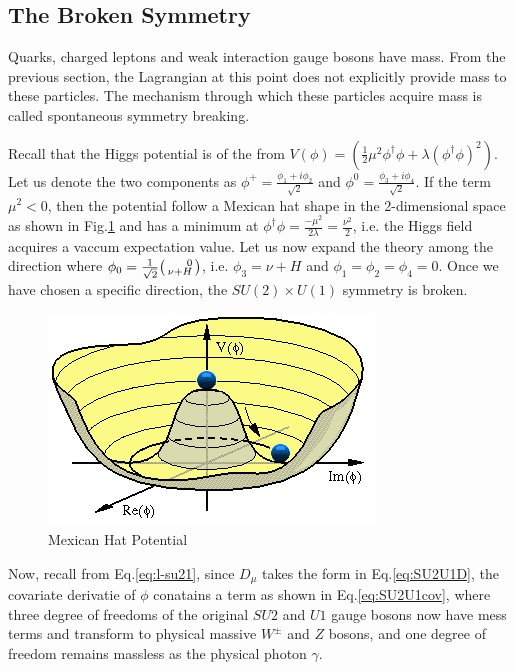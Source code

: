 \label{sec:theory-higgs}
\subsection{The Broken Symmetry}

Quarks, charged leptons and weak interaction gauge bosons have mass. From the previous section, the Lagrangian at this point does not explicitly provide mass to these particles. The mechanism through which these particles acquire mass is called spontaneous symmetry breaking.

Recall that the Higgs potential is of the from $V(\phi)=(\frac{1}{2}\mu^2\phi^{\dagger}\phi+\lambda(\phi^{\dagger}\phi )^2)$. Let us denote the two components as $\phi^+ = \frac{\phi_1+i\phi_2}{\sqrt{2}}$ and $\phi^0 = \frac{\phi_3+i\phi_4}{\sqrt{2}}$. If the term $\mu^2<0$, then the potential follow a Mexican hat shape in the 2-dimensional space as shown in Fig.\ref{fig:theory-mexican} and has a minimum at $\phi^{\dagger}\phi = \frac{-\mu^2}{2\lambda} = \frac{\nu^2}{2}$, i.e. the Higgs field acquires a vaccum expectation value. Let us now expand the theory among the direction where $\phi_0 = \frac{1}{\sqrt{2}}\begin{psmallmatrix*}[r]0\\ \nu+H \end{psmallmatrix*}$, i.e. $\phi_3=\nu+H$ and  $\phi_1=\phi_2=\phi_4 = 0$. Once we have chosen a specific direction, the $SU(2)\times U(1)$ symmetry is broken.


\begin{figure}[htpb!]
\begin{center}
  \includegraphics[width=0.45\linewidth]{figures/theory/MexicanHat.png}
\caption{Mexican Hat Potential}
\label{fig:theory-mexican}
\end{center}
\end{figure}


Now, recall from Eq.\ref{eq:l-su21}, since $D_{\mu}$ takes the form in Eq.\ref{eq:SU2U1D}, the covariate derivatie of $\phi$ conatains a term as shown in Eq.\ref{eq:SU2U1cov}, where three degree of freedoms of the original $SU2$ and $U1$ gauge bosons now have mess terms and transform to physical massive $W^{\pm}$ and $Z$ bosons, and one degree of freedom remains massless as the physical photon $\gamma$. 

